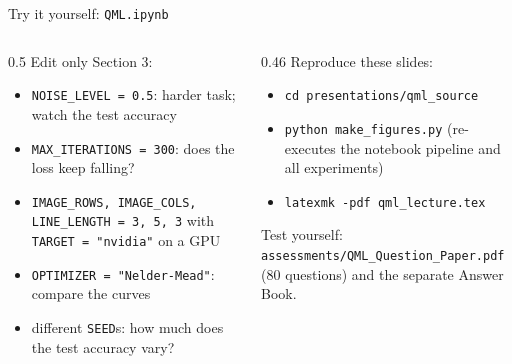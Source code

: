 \documentclass[aspectratio=169,11pt]{beamer}
\begin{document}
\begin{frame}{Try it yourself: \texttt{QML.ipynb}}
  \begin{columns}[T]
    \begin{column}{0.5\textwidth}
      \small
      Edit only Section 3:
      \begin{itemize}\itemsep1pt\scriptsize
        \item \texttt{NOISE\_LEVEL = 0.5}: harder task; watch the test accuracy
        \item \texttt{MAX\_ITERATIONS = 300}: does the loss keep falling?
        \item \texttt{IMAGE\_ROWS, IMAGE\_COLS, LINE\_LENGTH = 3, 5, 3} with \texttt{TARGET = "nvidia"} on a GPU
        \item \texttt{OPTIMIZER = "Nelder-Mead"}: compare the curves
        \item different \texttt{SEED}s: how much does the test accuracy vary?
      \end{itemize}
    \end{column}
    \begin{column}{0.46\textwidth}
      \small Reproduce these slides:
      \begin{itemize}\itemsep1pt\scriptsize
        \item \texttt{cd presentations/qml\_source}
        \item \texttt{python make\_figures.py} (re-executes the notebook pipeline and all experiments)
        \item \texttt{latexmk -pdf qml\_lecture.tex}
      \end{itemize}
      Test yourself: \texttt{assessments/QML\_Question\_Paper.pdf} (80 questions) and the separate Answer Book.
    \end{column}
  \end{columns}
\end{frame}

\end{document}
